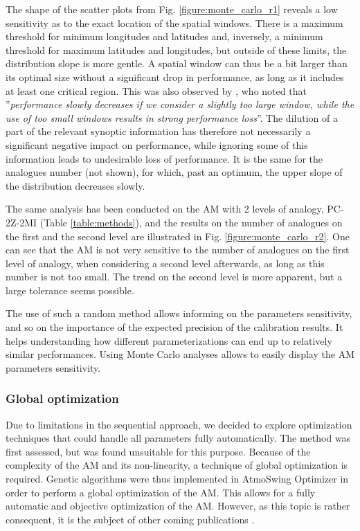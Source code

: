 \documentclass[review]{elsarticle}
\begin{document}
The shape of the scatter plots from Fig. \ref{figure:monte_carlo_r1} reveals a low sensitivity as to the exact location of the spatial windows. There is a maximum threshold for minimum longitudes and latitudes and, inversely, a minimum threshold for maximum latitudes and longitudes, but outside of these limits, the distribution slope is more gentle. A spatial window can thus be a bit larger than its optimal size without a significant drop in performance, as long as it includes at least one critical region. This was also observed by \citet{Bontron2004}, who noted that ''\textit{performance slowly decreases if we consider a slightly too large window, while the use of too small windows results in strong performance loss}''. The dilution of a part of the relevant synoptic information has therefore not necessarily a significant negative impact on performance, while ignoring some of this information leads to undesirable loss of performance. It is the same for the analogues number (not shown), for which, past an optimum, the upper slope of the distribution decreases slowly.

The same analysis has been conducted on the AM with 2 levels of analogy, PC-2Z-2MI (Table \ref{table:methods}), and the results on the number of analogues on the first and the second level are illustrated in Fig. \ref{figure:monte_carlo_r2}. One can see that the AM is not very sensitive to the number of analogues on the first level of analogy, when considering a second level afterwards, as long as this number is not too small. The trend on the second level is more apparent, but a large tolerance seems possible.

The use of such a random method allows informing on the parameters sensitivity, and so on the importance of the expected precision of the calibration results. It helps understanding how different parameterizations can end up to relatively similar performances. Using Monte Carlo analyses allows to easily display the AM parameters sensitivity. 


\subsubsection{Global optimization}
\label{sec:atmoswing-optimization}

Due to limitations in the sequential approach, we decided to explore optimization techniques that could handle all parameters fully automatically. The \citet{Nelder1965a} method was first assessed, but was found unsuitable for this purpose. Because of the complexity of the AM and its non-linearity, a technique of global optimization is required. Genetic algorithms were thus implemented in AtmoSwing Optimizer in order to perform a global optimization of the AM. This allows for a fully automatic and objective optimization of the AM. However, as this topic is rather consequent, it is the subject of other coming publications \cite[see][]{Horton2016a, Horton2016b}.
\end{document}
